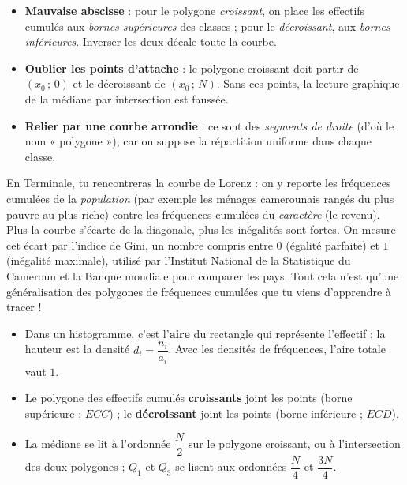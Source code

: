 \documentclass[11pt]{article}
\newcommand{\cle}[1]{{\popxbold\color{popdark}#1}}
\begin{document}
\begin{attention}
\begin{itemize}
\item \textbf{Mauvaise abscisse} : pour le polygone \emph{croissant}, on place les effectifs cumulés aux \emph{bornes supérieures} des classes ; pour le \emph{décroissant}, aux \emph{bornes inférieures}. Inverser les deux décale toute la courbe.
\item \textbf{Oublier les points d'attache} : le polygone croissant doit partir de $(x_0\,;\,0)$ et le décroissant de $(x_0\,;\,N)$. Sans ces points, la lecture graphique de la médiane par intersection est faussée.
\item \textbf{Relier par une courbe arrondie} : ce sont des \emph{segments de droite} (d'où le nom « polygone »), car on suppose la répartition uniforme dans chaque classe.
\end{itemize}
\end{attention}

\begin{savaistu}
En Terminale, tu rencontreras la \cle{courbe de Lorenz} : on y reporte les fréquences cumulées de la \emph{population} (par exemple les ménages camerounais rangés du plus pauvre au plus riche) contre les fréquences cumulées du \emph{caractère} (le revenu). Plus la courbe s'écarte de la diagonale, plus les inégalités sont fortes. On mesure cet écart par l'\cle{indice de Gini}, un nombre compris entre $0$ (égalité parfaite) et $1$ (inégalité maximale), utilisé par l'Institut National de la Statistique du Cameroun et la Banque mondiale pour comparer les pays. Tout cela n'est qu'une généralisation des polygones de fréquences cumulées que tu viens d'apprendre à tracer !
\end{savaistu}

\begin{aretenir}
\begin{itemize}
\item Dans un histogramme, c'est l'\textbf{aire} du rectangle qui représente l'effectif : la hauteur est la densité $d_i = \dfrac{n_i}{a_i}$. Avec les densités de fréquences, l'aire totale vaut $1$.
\item Le polygone des effectifs cumulés \textbf{croissants} joint les points (borne supérieure ; $ECC$) ; le \textbf{décroissant} joint les points (borne inférieure ; $ECD$).
\item La médiane se lit à l'ordonnée $\dfrac{N}{2}$ sur le polygone croissant, ou à l'intersection des deux polygones ; $Q_1$ et $Q_3$ se lisent aux ordonnées $\dfrac{N}{4}$ et $\dfrac{3N}{4}$.
\end{itemize}
\end{aretenir}
\end{document}
